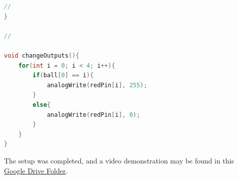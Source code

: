 \begin{arabicparts}
\begin{lstlisting}[language=C++]
   //
}

//

void changeOutputs(){
    for(int i = 0; i < 4; i++){
        if(ball[0] == i){
            analogWrite(redPin[i], 255);
        }
        else{
            analogWrite(redPin[i], 0);
        }
    }
}
    \end{lstlisting}

    \questionpart The setup was completed, and a video demonstration may be
    found in this
    \href{https://drive.google.com/drive/folders/1oetbbPwgUUYHVBNe5_pIktCHrrqsNl7a?usp=sharing}{
        Google Drive Folder}.

\end{arabicparts}